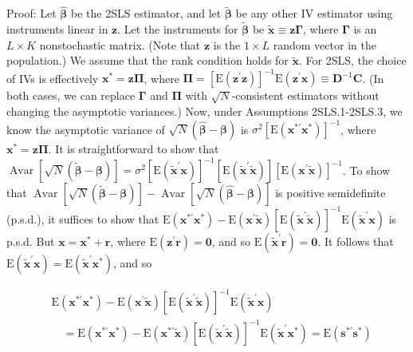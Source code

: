\documentclass[10pt]{article}
\begin{document}
Proof: Let $\hat{\boldsymbol{\beta}}$ be the 2SLS estimator, and let $\tilde{\boldsymbol{\beta}}$ be any other IV estimator using instruments linear in $\mathbf{z}$. Let the instruments for $\tilde{\boldsymbol{\beta}}$ be $\tilde{\mathbf{x}} \equiv \mathbf{z} \boldsymbol{\Gamma}$, where $\boldsymbol{\Gamma}$ is an $L \times K$ nonstochastic matrix. (Note that $\mathbf{z}$ is the $1 \times L$ random vector in the population.) We assume that the rank condition holds for $\tilde{\mathbf{x}}$. For 2SLS, the choice of IVs is effectively $\mathbf{x}^{*}=\mathbf{z} \boldsymbol{\Pi}$, where $\boldsymbol{\Pi}=\left[\mathrm{E}\left(\mathbf{z}^{\prime} \mathbf{z}\right)\right]^{-1} \mathrm{E}\left(\mathbf{z}^{\prime} \mathbf{x}\right) \equiv \mathbf{D}^{-1} \mathbf{C}$. (In both cases, we can replace $\boldsymbol{\Gamma}$ and $\boldsymbol{\Pi}$ with $\sqrt{N}$-consistent estimators without changing the asymptotic variances.) Now, under Assumptions 2SLS.1-2SLS.3, we know the asymptotic variance of $\sqrt{N}(\hat{\boldsymbol{\beta}}-\boldsymbol{\beta})$ is $\sigma^{2}\left[\mathrm{E}\left(\mathbf{x}^{* \prime} \mathbf{x}^{*}\right)\right]^{-1}$, where $\mathbf{x}^{*}=\mathbf{z} \boldsymbol{\Pi}$. It is straightforward to show that $\operatorname{Avar}[\sqrt{N}(\tilde{\boldsymbol{\beta}}-\boldsymbol{\beta})]=\sigma^{2}\left[\mathrm{E}\left(\tilde{\mathbf{x}}^{\prime} \mathbf{x}\right)\right]^{-1}\left[\mathrm{E}\left(\tilde{\mathbf{x}}^{\prime} \tilde{\mathbf{x}}\right)\right]\left[\mathrm{E}\left(\mathbf{x}^{\prime} \tilde{\mathbf{x}}\right)\right]^{-1}$. To show that $\operatorname{Avar}[\sqrt{N}(\tilde{\boldsymbol{\beta}}-\boldsymbol{\beta})] -\operatorname{Avar}[\sqrt{N}(\hat{\boldsymbol{\beta}}-\boldsymbol{\beta})]$ is positive semidefinite (p.s.d.), it suffices to show that $\mathrm{E}\left(\mathbf{x}^{* \prime} \mathbf{x}^{*}\right)- \mathrm{E}\left(\mathbf{x}^{\prime} \tilde{\mathbf{x}}\right)\left[\mathrm{E}\left(\tilde{\mathbf{x}}^{\prime} \tilde{\mathbf{x}}\right)\right]^{-1} \mathrm{E}\left(\tilde{\mathbf{x}}^{\prime} \mathbf{x}\right)$ is p.s.d. But $\mathbf{x}=\mathbf{x}^{*}+\mathbf{r}$, where $\mathrm{E}\left(\mathbf{z}^{\prime} \mathbf{r}\right)=\mathbf{0}$, and so $\mathrm{E}\left(\tilde{\mathbf{x}}^{\prime} \mathbf{r}\right)=\mathbf{0}$. It follows that $\mathrm{E}\left(\tilde{\mathbf{x}}^{\prime} \mathbf{x}\right)=\mathrm{E}\left(\tilde{\mathbf{x}}^{\prime} \mathbf{x}^{*}\right)$, and so

$$
\begin{aligned}
& \mathrm{E}\left(\mathbf{x}^{* \prime} \mathbf{x}^{*}\right)-\mathrm{E}\left(\mathbf{x}^{\prime} \tilde{\mathbf{x}}\right)\left[\mathrm{E}\left(\tilde{\mathbf{x}}^{\prime} \tilde{\mathbf{x}}\right)\right]^{-1} \mathrm{E}\left(\tilde{\mathbf{x}}^{\prime} \mathbf{x}\right) \\
& \quad=\mathrm{E}\left(\mathbf{x}^{* \prime} \mathbf{x}^{*}\right)-\mathrm{E}\left(\mathbf{x}^{* \prime} \tilde{\mathbf{x}}\right)\left[\mathrm{E}\left(\tilde{\mathbf{x}}^{\prime} \tilde{\mathbf{x}}\right)\right]^{-1} \mathrm{E}\left(\tilde{\mathbf{x}}^{\prime} \mathbf{x}^{*}\right)=\mathrm{E}\left(\mathbf{s}^{* \prime} \mathbf{s}^{*}\right)
\end{aligned}
$$
\end{document}
